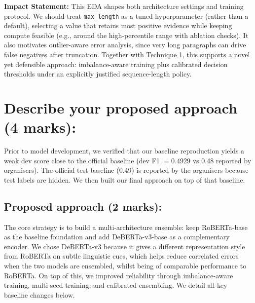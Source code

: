 \documentclass[11pt, a4paper]{article}
\begin{document}
\textbf{Impact Statement:}
This EDA shapes both architecture settings and training protocol. We should treat \texttt{max\_length} as a tuned hyperparameter (rather than a default), selecting a value that retains most positive evidence while keeping compute feasible (e.g., around the high-percentile range with ablation checks). It also motivates outlier-aware error analysis, since very long paragraphs can drive false negatives after truncation. Together with Technique 1, this supports a novel yet defensible approach: imbalance-aware training plus calibrated decision thresholds under an explicitly justified sequence-length policy.

\newpage
\section{Describe your proposed approach (4 marks):}
Prior to model development, we verified that our baseline reproduction yields a weak dev score close to the official baseline (dev F1 \(=0.4929\) vs 0.48 reported by organisers). The official test baseline (0.49) is reported by the organisers because test labels are hidden. We then built our final approach on top of that baseline.
\subsection{Proposed approach (2 marks):}
The core strategy is to build a multi-architecture ensemble: keep RoBERTa-base as the baseline foundation and add DeBERTa-v3-base as a complementary encoder. We chose DeBERTa-v3 because it gives a different representation style from RoBERTa on subtle linguistic cues, which helps reduce correlated errors when the two models are ensembled, whilst being of comparable performance to RoBERTa. On top of this, we improved reliability through imbalance-aware training, multi-seed training, and calibrated ensembling. We detail all key baseline changes below.
\end{document}
